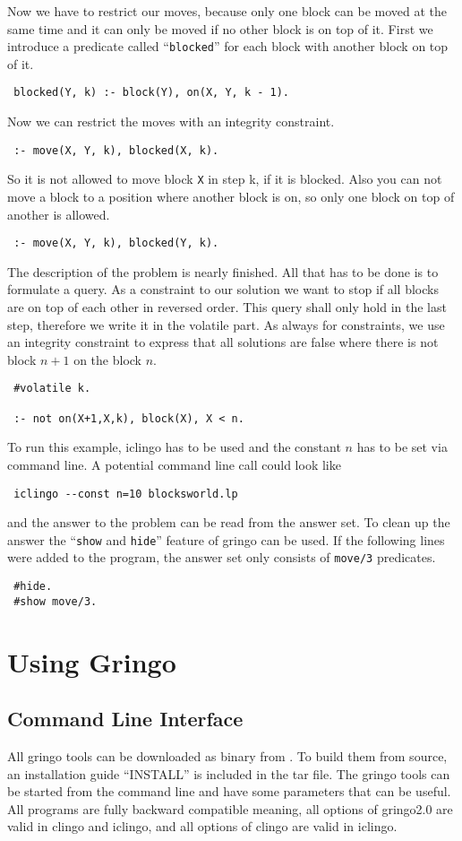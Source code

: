 \documentclass[a4paper,10pt]{article}
\begin{document}
Now we have to restrict our moves, because only one block can be moved at the same time and it can only be moved if no other block is on top of it.
First we introduce a predicate called ``\texttt{blocked}'' for each block with another block on top of it.
\begin{verbatim}
 blocked(Y, k) :- block(Y), on(X, Y, k - 1).
\end{verbatim}
Now we can restrict the moves with an integrity constraint.
\begin{verbatim}
 :- move(X, Y, k), blocked(X, k).
\end{verbatim}
So it is not allowed to move block \texttt{X} in step k, if it is blocked.
Also you can not move a block to a position where another block is on, so only one block on top of another is allowed.
\begin{verbatim}
 :- move(X, Y, k), blocked(Y, k).
\end{verbatim}
The description of the problem is nearly finished. All that has to be done is to formulate a query.
As a constraint to our solution we want to stop if all blocks are on top of each other in reversed order.
This query shall only hold in the last step, therefore we write it in the volatile part.
As always for constraints, we use an integrity constraint to express that all solutions are false where there is not block $n+1$ on the block $n$.
\begin{verbatim}
 #volatile k.

 :- not on(X+1,X,k), block(X), X < n.
\end{verbatim}
To run this example, iclingo has to be used and the constant $n$ has to be set via command line.
A potential command line call could look like
\begin{verbatim}
 iclingo --const n=10 blocksworld.lp
\end{verbatim}
and the answer to the problem can be read from the answer set.
To clean up the answer the ``\texttt{show} and \texttt{hide}'' feature of gringo can be used.
If the following lines were added to the program, the answer set only consists of \texttt{move/3} predicates.
\begin{verbatim}
 #hide.
 #show move/3.
\end{verbatim}


\section{Using Gringo}
\subsection{Command Line Interface}
All gringo tools can be downloaded as binary from \cite{download}. To build them from source, an installation guide ``INSTALL'' is included in the tar file.
The gringo tools can be started from the command line and have some parameters that can be useful.
All programs are fully backward compatible meaning, all options of gringo2.0 are valid in clingo and iclingo, and all options of clingo are valid in iclingo.
\end{document}
